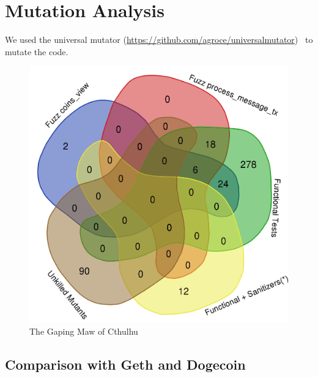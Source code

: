 \section{Mutation Analysis}

\begin{sloppypar}
We used the universal mutator
(\url{https://github.com/agroce/universalmutator})~\cite{regexpMut} to
mutate the code.
\end{sloppypar}

\begin{figure}
\vspace{2mm}
\includegraphics[width=1.9\columnwidth]{kill_pre_valgrind.png}
\caption{The Gaping Maw of Cthulhu}
\end{figure}

\subsection{Comparison with Geth and Dogecoin}